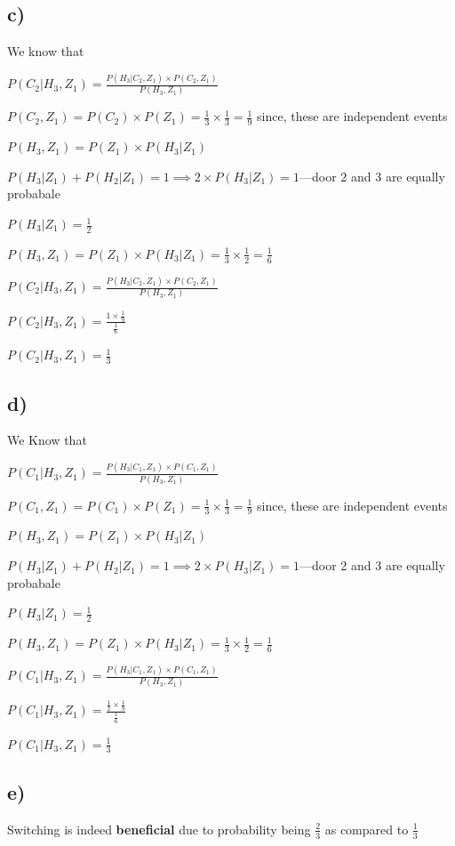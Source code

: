 \documentclass{article}
\begin{document}
\subsection*{c)}
    We know that
    \par 
    $P(C_2|H_3,Z_1)=\frac{P(H_3|C_2,Z_1)\times P(C_2,Z_1)}{P(H_3,Z_1)}$
    \par 
    $P(C_2,Z_1)=P(C_2)\times P(Z_1)=\frac{1}{3}\times \frac{1}{3}= \frac{1}{9}$
    since, these are independent events
    \par 
    $P(H_3,Z_1)=P(Z_1)\times P(H_3|Z_1)$
    \par 
    $P(H_3|Z_1)+P(H_2|Z_1)=1 \implies 2\times P(H_3|Z_1)=1$---door 2 and 3 are equally probabale
    \par 
    $P(H_3|Z_1)=\frac{1}{2}$
    \par
    $P(H_3,Z_1)=P(Z_1)\times P(H_3|Z_1)=\frac{1}{3}\times \frac{1}{2} =\frac{1}{6}$
    \par
    $P(C_2|H_3,Z_1)=\frac{P(H_3|C_2,Z_1)\times P(C_2,Z_1)}{P(H_3,Z_1)}$
    \par 
    $P(C_2|H_3,Z_1)=\frac{1\times\frac{1}{9}}{\frac{1}{6}}$
    \par 
    $P(C_2|H_3,Z_1)=\frac{1}{3}$
\subsection*{d)}
    We Know that
    \par 
    $P(C_1|H_3,Z_1)=\frac{P(H_3|C_1,Z_1)\times P(C_1,Z_1)}{P(H_3,Z_1)}$
    \par 
    $P(C_1,Z_1)=P(C_1)\times P(Z_1)=\frac{1}{3}\times \frac{1}{3}= \frac{1}{9}$
    since, these are independent events
    \par 
    $P(H_3,Z_1)=P(Z_1)\times P(H_3|Z_1)$
    \par 
    $P(H_3|Z_1)+P(H_2|Z_1)=1 \implies 2\times P(H_3|Z_1)=1$---door 2 and 3 are equally probabale
    \par 
    $P(H_3|Z_1)=\frac{1}{2}$
    \par
    $P(H_3,Z_1)=P(Z_1)\times P(H_3|Z_1)=\frac{1}{3}\times \frac{1}{2} =\frac{1}{6}$
    \par
    $P(C_1|H_3,Z_1)=\frac{P(H_3|C_1,Z_1)\times P(C_1,Z_1)}{P(H_3,Z_1)}$
    \par 
    $P(C_1|H_3,Z_1)=\frac{\frac{1}{2}\times\frac{1}{9}}{\frac{1}{6}}$
    \par 
    $P(C_1|H_3,Z_1)=\frac{1}{3}$
\subsection*{e)}
    Switching is indeed \textbf{beneficial} due to probability being $\frac{2}{3}$ as compared to $\frac{1}{3}$
\end{document}
